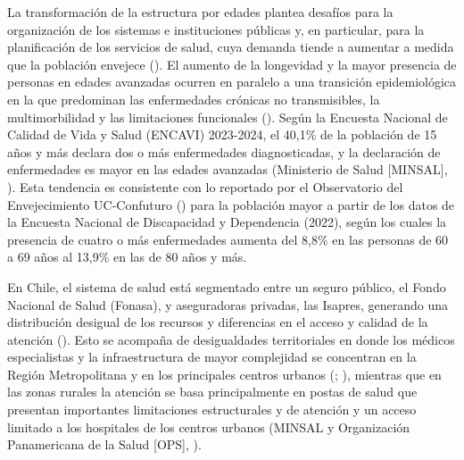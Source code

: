 \documentclass[
  spanish,
  a4paper,
  oneside]{scrbook}
\begin{document}
La transformación de la estructura por edades plantea desafíos para la
organización de los sistemas e instituciones públicas y, en particular,
para la planificación de los servicios de salud, cuya demanda tiende a
aumentar a medida que la población envejece
(). El aumento
de la longevidad y la mayor presencia de personas en edades avanzadas
ocurren en paralelo a una transición epidemiológica en la que predominan
las enfermedades crónicas no transmisibles, la multimorbilidad y las
limitaciones funcionales
(). Según la
Encuesta Nacional de Calidad de Vida y Salud (ENCAVI) 2023-2024, el
40,1\% de la población de 15 años y más declara dos o más enfermedades
diagnosticadas, y la declaración de enfermedades es mayor en las edades
avanzadas (Ministerio de Salud {[}MINSAL{]},
). Esta tendencia es
consistente con lo reportado por el Observatorio del Envejecimiento
UC-Confuturo () para la
población mayor a partir de los datos de la Encuesta Nacional de
Discapacidad y Dependencia (2022), según los cuales la presencia de
cuatro o más enfermedades aumenta del 8,8\% en las personas de 60 a 69
años al 13,9\% en las de 80 años y más.

En Chile, el sistema de salud está segmentado entre un seguro público,
el Fondo Nacional de Salud (Fonasa), y aseguradoras privadas, las
Isapres, generando una distribución desigual de los recursos y
diferencias en el acceso y calidad de la atención
(). Esto se acompaña de desigualdades territoriales en donde los
médicos especialistas y la infraestructura de mayor complejidad se
concentran en la Región Metropolitana y en los principales centros
urbanos (;
), mientras que en las zonas rurales la atención se basa
principalmente en postas de salud que presentan importantes limitaciones
estructurales y de atención y un acceso limitado a los hospitales de los
centros urbanos (MINSAL y Organización Panamericana de la Salud
{[}OPS{]}, ).
\end{document}
